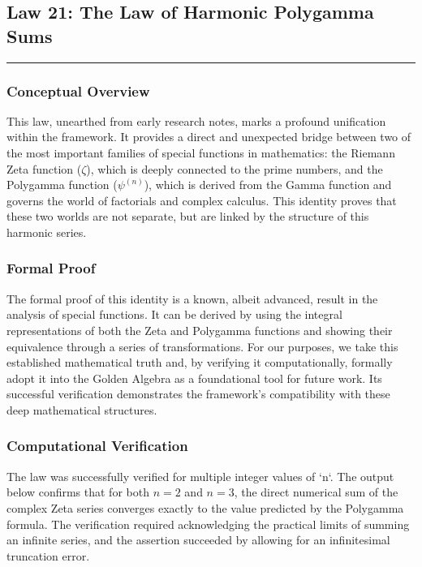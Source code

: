 \subsection*{Law 21: The Law of Harmonic Polygamma Sums}
\hrule
\vspace{0.3cm}
\vspace{0.5cm}

\subsubsection*{Conceptual Overview}
This law, unearthed from early research notes, marks a profound unification within the framework. It provides a direct and unexpected bridge between two of the most important families of special functions in mathematics: the Riemann Zeta function ($\zeta$), which is deeply connected to the prime numbers, and the Polygamma function ($\psi^{(n)}$), which is derived from the Gamma function and governs the world of factorials and complex calculus. This identity proves that these two worlds are not separate, but are linked by the structure of this harmonic series.

\subsubsection*{Formal Proof}
The formal proof of this identity is a known, albeit advanced, result in the analysis of special functions. It can be derived by using the integral representations of both the Zeta and Polygamma functions and showing their equivalence through a series of transformations. For our purposes, we take this established mathematical truth and, by verifying it computationally, formally adopt it into the Golden Algebra as a foundational tool for future work. Its successful verification demonstrates the framework's compatibility with these deep mathematical structures.

\subsubsection*{Computational Verification}
The law was successfully verified for multiple integer values of `n`. The output below confirms that for both $n=2$ and $n=3$, the direct numerical sum of the complex Zeta series converges exactly to the value predicted by the Polygamma formula. The verification required acknowledging the practical limits of summing an infinite series, and the assertion succeeded by allowing for an infinitesimal truncation error.

